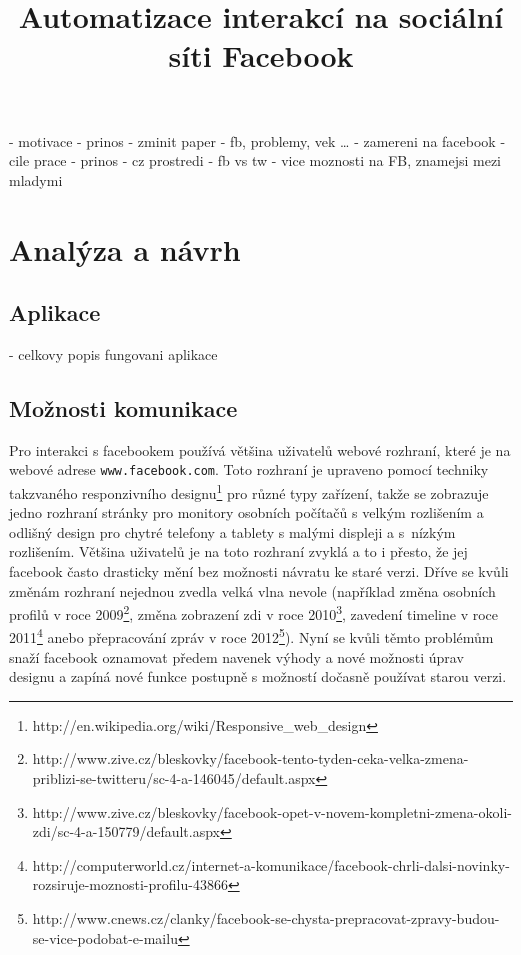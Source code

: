 \documentclass[thesis=M,czech]{FITthesis}[2013/05/10]
\title{Automatizace interakcí na sociální síti Facebook}
\begin{document}

\begin{introduction}
- motivace
- prinos
- zminit paper
- fb, problemy, vek …
- zamereni na facebook
- cile prace
- prinos
- cz prostredi
- fb vs tw - vice moznosti na FB, znamejsi mezi mladymi
\end{introduction}

\chapter{Analýza a návrh}

\section{Aplikace}
- celkovy popis fungovani aplikace

\section{Možnosti komunikace}
Pro interakci s facebookem používá většina uživatelů webové rozhraní, 
které je na webové adrese \verb|www.facebook.com|. 
Toto rozhraní je upraveno pomocí techniky takzvaného responzivního 
designu\footnote{http://en.wikipedia.org/wiki/Responsive\_web\_design} 
pro různé typy zařízení, 
takže se zobrazuje jedno rozhraní stránky pro monitory osobních
 počítačů s velkým rozlišením a 
odlišný design pro chytré telefony a tablety s malými displeji a 
s~nízkým rozlišením. 
Většina uživatelů je na toto rozhraní zvyklá a to i přesto, 
že jej facebook často drasticky mění bez možnosti návratu ke staré verzi. 
Dříve se kvůli změnám rozhraní nejednou zvedla velká vlna nevole 
(například změna osobních profilů v roce 
2009\footnote{http://www.zive.cz/bleskovky/facebook-tento-tyden-ceka-velka-zmena-priblizi-se-twitteru/sc-4-a-146045/default.aspx}, 
změna zobrazení zdi v roce 
2010\footnote{http://www.zive.cz/bleskovky/facebook-opet-v-novem-kompletni-zmena-okoli-zdi/sc-4-a-150779/default.aspx}, 
zavedení timeline v roce 
2011\footnote{http://computerworld.cz/internet-a-komunikace/facebook-chrli-dalsi-novinky-rozsiruje-moznosti-profilu-43866} anebo přepracování zpráv v roce 
2012\footnote{http://www.cnews.cz/clanky/facebook-se-chysta-prepracovat-zpravy-budou-se-vice-podobat-e-mailu}). 
Nyní se kvůli těmto problémům snaží facebook oznamovat předem 
navenek výhody a nové možnosti úprav designu a zapíná nové funkce 
postupně s možností dočasně používat starou verzi.  
\end{document}
